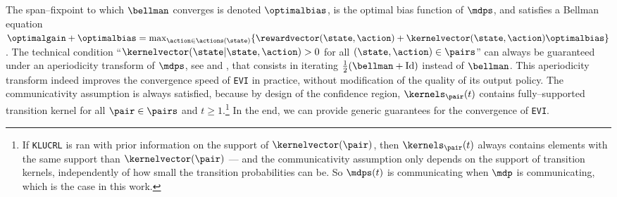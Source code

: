 \documentclass[preprint,cleveref,12pt]{colt2025}
\DeclarePairedDelimiter{\braces}{\{}{\}}	%
\def\model{\mdp}
\def\models{\mdps}
\def\kernel{\kernelvector}
\def\reward{\rewardvector}
\def\optgain{\optimalgain} %
\def\optbias{\optimalbias} %
\begin{document}
    The span--fixpoint to which $\bellman$ converges is denoted $\optbias$, is the optimal bias function of $\models$, and satisfies a Bellman equation $\optgain + \optbias = \max_{\action \in \actions(\state)} \braces{\reward(\state, \action) + \kernel(\state, \action) \optbias}$. 
    The technical condition ``$\kernel(\state|\state, \action) > 0$ for all $(\state, \action) \in \pairs$'' can always be guaranteed under an aperiodicity transform of $\models$, see \cite[§8.5.4]{puterman_markov_1994} and \cite[§4]{bartlett_regal_2009}, that consists in iterating $\frac 12 (\bellman + \mathrm{Id})$ instead of $\bellman$. 
    This aperiodicity transform indeed improves the convergence speed of \texttt{EVI} in practice, without modification of the quality of its output policy. 
    The communicativity assumption is always satisfied, because by design of the confidence region, $\kernels_\pair(t)$ contains fully--supported transition kernel for all $\pair \in \pairs$ and $t \ge 1$.\footnote{If \texttt{KLUCRL} is ran with prior information on the support of $\kernel(\pair)$, then $\kernels_\pair(t)$ always contains elements with the same support than $\kernel(\pair)$ --- and the communicativity assumption only depends on the support of transition kernels, independently of how small the transition probabilities can be. So $\models(t)$ is communicating when $\model$ is communicating, which is the case in this work.}
    In the end, we can provide generic guarantees for the convergence of \texttt{EVI}.
\end{document}
